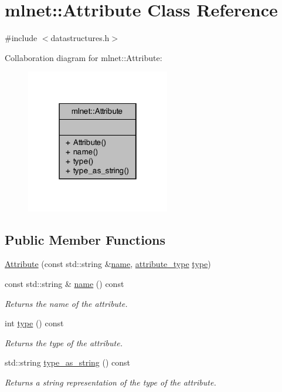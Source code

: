 \hypertarget{classmlnet_1_1_attribute}{\section{mlnet\+:\+:Attribute Class Reference}
\label{classmlnet_1_1_attribute}
}


{\ttfamily \#include $<$datastructures.\+h$>$}



Collaboration diagram for mlnet\+:\+:Attribute\+:\nopagebreak
\begin{figure}[H]
\begin{center}
\leavevmode
\includegraphics[width=178pt]{classmlnet_1_1_attribute__coll__graph}
\end{center}
\end{figure}
\subsection*{Public Member Functions}
\begin{DoxyCompactItemize}
\item 
\hyperlink{classmlnet_1_1_attribute_a51e4b9bb6f82914ffb6be78a4c28ab52}{Attribute} (const std\+::string \&\hyperlink{classmlnet_1_1_attribute_acac4019686c3a0a1c4362eea4d8e12e9}{name}, \hyperlink{namespacemlnet_a8bd10c6e8e4d27ef4d974b3f576a3a06}{attribute\+\_\+type} \hyperlink{classmlnet_1_1_attribute_ab9a7df6d77100640dfba5dcbf82aa977}{type})
\item 
const std\+::string \& \hyperlink{classmlnet_1_1_attribute_acac4019686c3a0a1c4362eea4d8e12e9}{name} () const 
\begin{DoxyCompactList}\small\item\em Returns the name of the attribute. \end{DoxyCompactList}\item 
int \hyperlink{classmlnet_1_1_attribute_ab9a7df6d77100640dfba5dcbf82aa977}{type} () const 
\begin{DoxyCompactList}\small\item\em Returns the type of the attribute. \end{DoxyCompactList}\item 
std\+::string \hyperlink{classmlnet_1_1_attribute_a0eb1239e4b715ce506129842387e5509}{type\+\_\+as\+\_\+string} () const 
\begin{DoxyCompactList}\small\item\em Returns a string representation of the type of the attribute. \end{DoxyCompactList}\end{DoxyCompactItemize}


